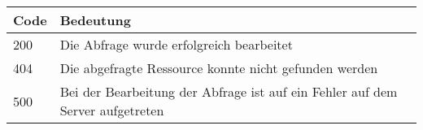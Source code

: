 \documentclass[a4paper]{scrartcl}
\begin{document}
\begin{table}[H]

\begin{tabular}{ll}

Code & Bedeutung \\
\hline
200 & Die Abfrage wurde erfolgreich bearbeitet  \\

404 & Die abgefragte Ressource konnte nicht gefunden werden  \\

500 & Bei der Bearbeitung der Abfrage ist auf ein Fehler auf dem Server aufgetreten   \\

\end{tabular}\label{tab:table2}
\end{table}
\end{document}
